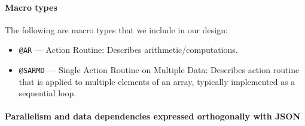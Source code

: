 \documentclass{article}
\begin{document}
\paragraph{Macro types}

The following are macro types that we include in our design:
\begin{itemize}
  \item \texttt{@AR} --- Action Routine: Describes arithmetic/computations.
  \item \texttt{@SARMD} --- Single Action Routine on Multiple Data: Describes
    action routine that is applied to multiple elements of an array, typically
    implemented as a sequential loop.

\end{itemize}

\paragraph{Parallelism and data dependencies expressed orthogonally with JSON}
\end{document}

